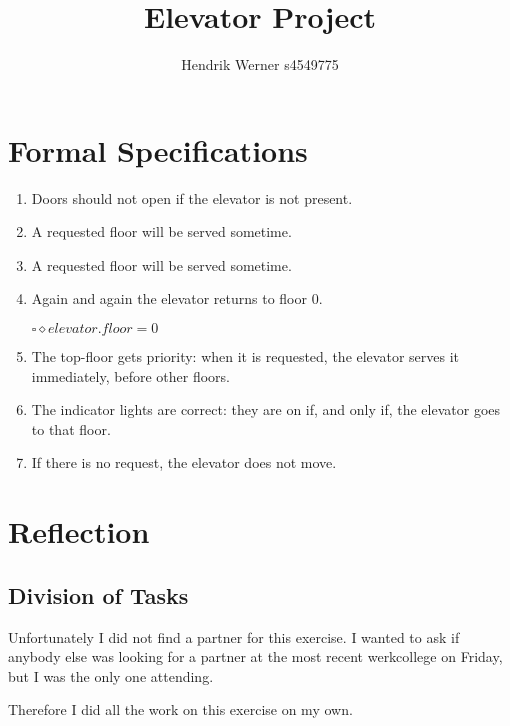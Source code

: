 \documentclass[12pt, a4paper]{article}
\title{Elevator Project}
\author{Hendrik Werner s4549775}
\begin{document}
\maketitle

\section{Formal Specifications}
\begin{enumerate}
	\item %
	Doors should not open if the elevator is not present.
	\item %
	A requested floor will be served sometime.
	\item %
	A requested floor will be served sometime.
	\item %
	Again and again the elevator returns to floor 0.

	$\square \diamond elevator.floor = 0$
	\item %
	The top-floor gets priority: when it is requested, the elevator serves it immediately, before other floors.
	\item %
	The indicator lights are correct: they are on if, and only if, the elevator goes to that floor.
	\item %
	If there is no request, the elevator does not move.
\end{enumerate}

\section{Reflection}
\subsection{Division of Tasks}
Unfortunately I did not find a partner for this exercise. I wanted to ask if anybody else was looking for a partner at the most recent werkcollege on Friday, but I was the only one attending.

Therefore I did all the work on this exercise on my own.
\end{document}
